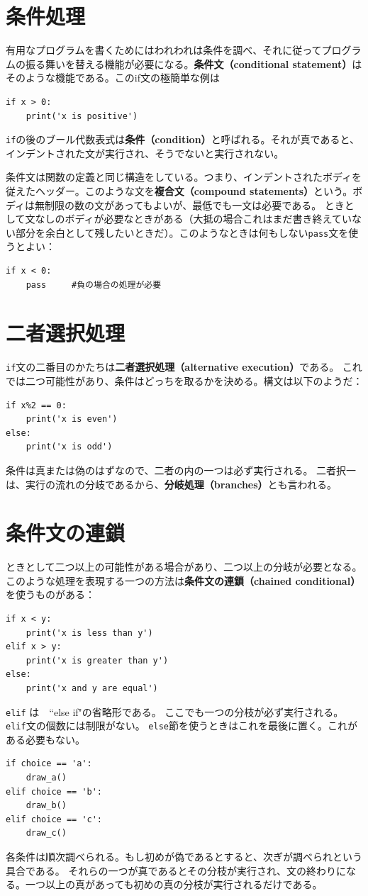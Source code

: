 \documentclass[a4j,12pt,makeidx]{jbook}
\begin{document}
\section{条件処理}
有用なプログラムを書くためにはわれわれは条件を調べ、それに従ってプログラムの振る舞いを替える機能が必要になる。{\bf 条件文（conditional statement）}はそのような機能である。このif文の極簡単な例は
\begin{verbatim}
if x > 0:
    print('x is positive')
\end{verbatim}
{\tt if}の後のブール代数表式は{\bf 条件（condition）}と呼ばれる。それが真であると、インデントされた文が実行され、そうでないと実行されない。\par
条件文は関数の定義と同じ構造をしている。つまり、インデントされたボディを従えたヘッダー。このような文を{\bf 複合文（compound statements）}という。ボディは無制限の数の文があってもよいが、最低でも一文は必要である。
ときとして文なしのボディが必要なときがある（大抵の場合これはまだ書き終えていない部分を余白として残したいときだ）。このようなときは何もしない{\tt pass}文を使うとよい：
\begin{verbatim}
if x < 0:
    pass     #負の場合の処理が必要
\end{verbatim}
%
\section{二者選択処理}
{\tt if}文の二番目のかたちは{\bf 二者選択処理（alternative execution）}である。
これでは二つ可能性があり、条件はどっちを取るかを決める。構文は以下のようだ：
\begin{verbatim}
if x%2 == 0:
    print('x is even')
else:
    print('x is odd')
\end{verbatim}
条件は真または偽のはずなので、二者の内の一つは必ず実行される。
二者択一は、実行の流れの分岐であるから、{\bf 分岐処理（branches）}とも言われる。
%
\section{条件文の連鎖}
ときとして二つ以上の可能性がある場合があり、二つ以上の分岐が必要となる。
このような処理を表現する一つの方法は{\bf 条件文の連鎖（chained conditional）}を使うものがある：
\begin{verbatim}
if x < y:
    print('x is less than y')
elif x > y:
    print('x is greater than y')
else:
    print('x and y are equal')
\end{verbatim}
{\tt elif} は　``else if"の省略形である。
ここでも一つの分枝が必ず実行される。{\tt elif}文の個数には制限がない。
{\tt else}節を使うときはこれを最後に置く。これがある必要もない。
\begin{verbatim}
if choice == 'a':
    draw_a()
elif choice == 'b':
    draw_b()
elif choice == 'c':
    draw_c()
\end{verbatim}   
各条件は順次調べられる。もし初めが偽であるとすると、次ぎが調べられという具合である。
それらの一つが真であるとその分枝が実行され、文の終わりになる。一つ以上の真があっても初めの真の分枝が実行されるだけである。
%
\end{document}
